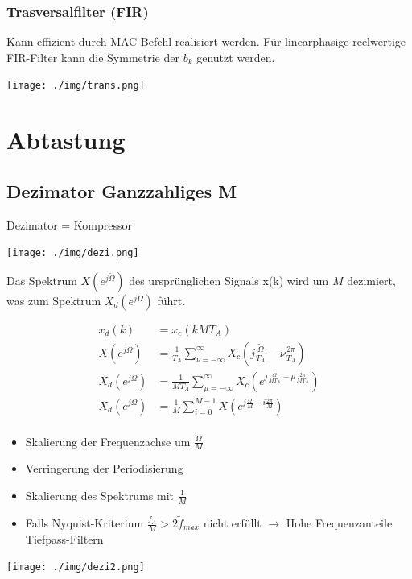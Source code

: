 \documentclass[10pt,a4paper]{article}
\begin{document}
\subsubsection{Trasversalfilter (FIR)}
Kann effizient durch MAC-Befehl realisiert werden. 
Für linearphasige reelwertige FIR-Filter kann die Symmetrie der $b_k$ genutzt werden.
  \begin{center}
      \texttt{[image: ./img/trans.png]}
  \end{center}
\section{Abtastung}
\subsection{Dezimator Ganzzahliges M}
Dezimator = Kompressor 
  \begin{center}
      \texttt{[image: ./img/dezi.png]}
  \end{center}
Das Spektrum $X(e^{j\tilde{\Omega}})$ des ursprünglichen Signals x(k) wird um $M$ dezimiert,
was zum Spektrum $X_d(e^{j\Omega})$ führt.
  \begin{mdframed}[style=exercise]
    \begin{align}
        x_d(k)&=x_c(kMT_A)\\
        X(e^{j\tilde{\Omega}})&=\frac{1}{T_A}\sum_{\nu=-\infty}^{\infty} X_c(j\frac{\tilde{\Omega}}{T_A} -\nu\frac{2\pi}{T_A})\\
        X_d(e^{j\Omega})&=\frac{1}{MT_A}\sum_{\mu=-\infty}^{\infty} X_c(e^{j\frac{\Omega}{MT_A} -\mu\frac{2\pi}{MT_A}})\\
        X_d(e^{j\Omega})&=\frac{1}{M}\sum_{i=0}^{M-1} X(e^{j\frac{\Omega}{M} -i\frac{2\pi}{M}})\\
    \end{align}
  \end{mdframed}
  \begin{itemize}
    \item Skalierung der Frequenzachse um $\frac{\Omega}{M}$
    \item Verringerung der Periodisierung
    \item Skalierung des Spektrums mit $\frac{1}{M}$
    \item Falls Nyquist-Kriterium $\frac{f_A}{M}>2\tilde{f}_{max}$ nicht erfüllt $\rightarrow$ Hohe Frequenzanteile Tiefpass-Filtern 
  \end{itemize}
  \begin{center}
      \texttt{[image: ./img/dezi2.png]}
  \end{center}
\end{document}
